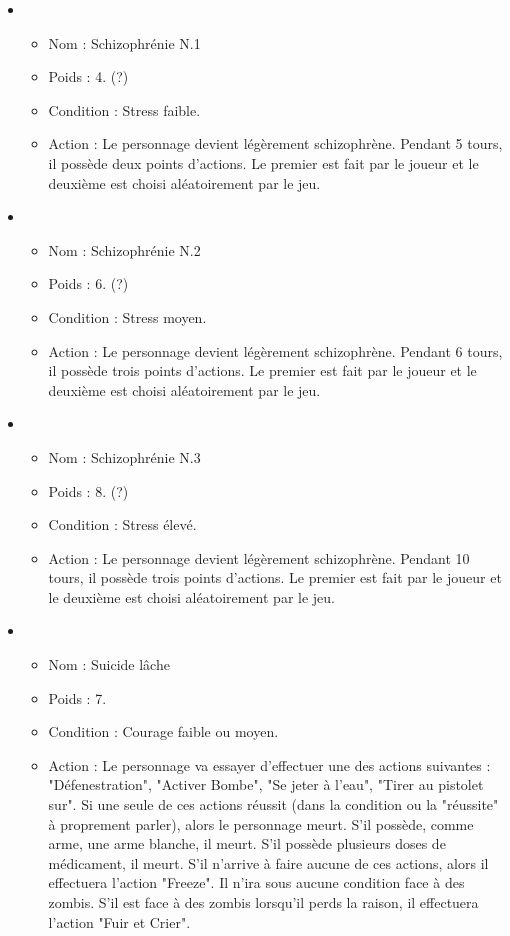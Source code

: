 \begin{itemize}
   \item \begin{itemize}
   		\item Nom : Schizophrénie N.1
   		\item Poids : 4. (?)
   	 	\item Condition : Stress faible.
   	 	\item Action : Le personnage devient légèrement schizophrène. Pendant 5 tours, il possède deux points d'actions. Le premier est fait par le joueur et le deuxième est choisi aléatoirement par le jeu.
   \end{itemize}
   \item \begin{itemize}
   		\item Nom : Schizophrénie N.2
   		\item Poids : 6. (?)
   	 	\item Condition : Stress moyen.
   	 	\item Action : Le personnage devient légèrement schizophrène. Pendant 6 tours, il possède trois points d'actions. Le premier est fait par le joueur et le deuxième est choisi aléatoirement par le jeu.
   \end{itemize}
   \item \begin{itemize}
   		\item Nom : Schizophrénie N.3
   		\item Poids : 8. (?)
   	 	\item Condition : Stress élevé.
   	 	\item Action : Le personnage devient légèrement schizophrène. Pendant 10 tours, il possède trois points d'actions. Le premier est fait par le joueur et le deuxième est choisi aléatoirement par le jeu.
   \end{itemize}
   \item \begin{itemize}
   		\item Nom : Suicide lâche
   		\item Poids : 7.
   	 	\item Condition : Courage faible ou moyen.
   	 	\item Action : Le personnage va essayer d'effectuer une des actions suivantes : "Défenestration", "Activer Bombe", "Se jeter à l'eau", "Tirer au pistolet sur". Si une seule de ces actions réussit (dans la condition ou la "réussite" à proprement parler), alors le personnage meurt. S'il possède, comme arme, une arme blanche, il meurt. S'il possède plusieurs doses de médicament, il meurt. S'il n'arrive à faire aucune de ces actions, alors il effectuera l'action "Freeze". Il n'ira sous aucune condition face à des zombis. S'il est face à des zombis lorsqu'il perds la raison, il effectuera l'action "Fuir et Crier".

\end{itemize}
\end{itemize}
